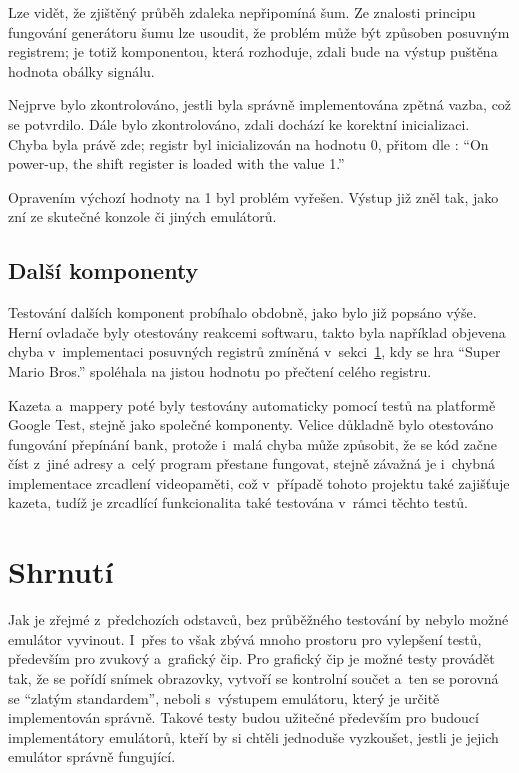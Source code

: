 Lze vidět, že zjištěný průběh zdaleka nepřipomíná šum. Ze znalosti principu fungování generátoru šumu lze usoudit, že problém může být způsoben posuvným registrem; je totiž komponentou, která rozhoduje, zdali bude na výstup puštěna hodnota obálky signálu.

Nejprve bylo zkontrolováno, jestli byla správně implementována zpětná vazba, což se potvrdilo. Dále bylo zkontrolováno, zdali dochází ke korektní inicializaci. Chyba byla právě zde; registr byl inicializován na hodnotu 0, přitom dle \cite{Nesdev:apu-noise}: \enquote{On power-up, the shift register is loaded with the value 1.}

Opravením výchozí hodnoty na 1 byl problém vyřešen. Výstup již zněl tak, jako zní ze skutečné konzole či jiných emulátorů.

\subsection{Další komponenty}
Testování dalších komponent probíhalo obdobně, jako bylo již popsáno výše. Herní ovladače byly otestovány reakcemi softwaru, takto byla například objevena chyba v~implementaci posuvných registrů zmíněná v~sekci~\ref{}, kdy se hra \enquote{Super Mario Bros.} spoléhala na jistou hodnotu po přečtení celého registru.

Kazeta a~mappery poté byly testovány automaticky pomocí testů na platformě Google Test, stejně jako společné komponenty. Velice důkladně bylo otestováno fungování přepínání bank, protože i~malá chyba může způsobit, že se kód začne číst z~jiné adresy a~celý program přestane fungovat, stejně závažná je i~chybná implementace zrcadlení videopaměti, což v~případě tohoto projektu také zajišťuje kazeta, tudíž je zrcadlící funkcionalita také testována v~rámci těchto testů.

\section{Shrnutí}
Jak je zřejmé z~předchozích odstavců, bez průběžného testování by nebylo možné emulátor vyvinout. I~přes to však zbývá mnoho prostoru pro vylepšení testů, především pro zvukový a~grafický čip. Pro grafický čip je možné testy provádět tak, že se pořídí snímek obrazovky, vytvoří se kontrolní součet a~ten se porovná se \enquote{zlatým standardem}, neboli s~výstupem emulátoru, který je určitě implementován správně. Takové testy budou užitečné především pro budoucí implementátory emulátorů, kteří by si chtěli jednoduše vyzkoušet, jestli je jejich emulátor správně fungující.

